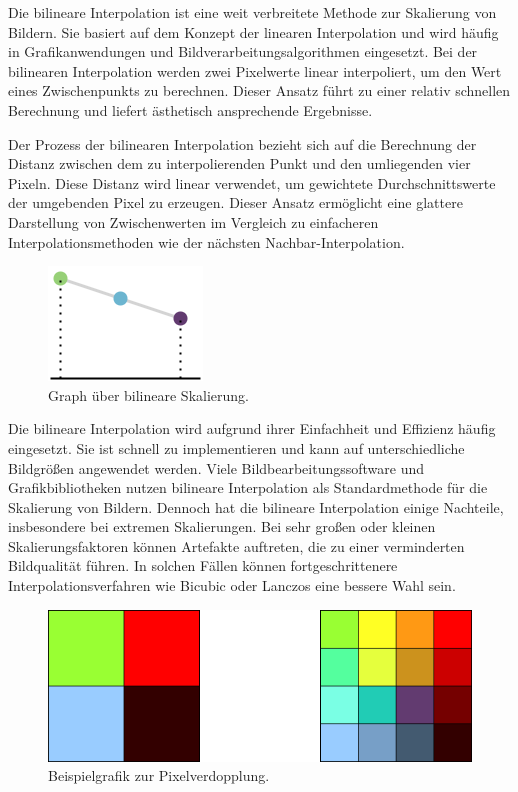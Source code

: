         Die bilineare Interpolation ist eine weit verbreitete Methode zur Skalierung von Bildern.
        Sie basiert auf dem Konzept der linearen Interpolation und wird häufig in Grafikanwendungen und Bildverarbeitungsalgorithmen eingesetzt.
        Bei der bilinearen Interpolation werden zwei Pixelwerte linear interpoliert, um den Wert eines Zwischenpunkts zu berechnen.
        Dieser Ansatz führt zu einer relativ schnellen Berechnung und liefert ästhetisch ansprechende Ergebnisse.

        Der Prozess der bilinearen Interpolation bezieht sich auf die Berechnung der Distanz zwischen dem zu interpolierenden Punkt und den umliegenden vier Pixeln.
        Diese Distanz wird linear verwendet, um gewichtete Durchschnittswerte der umgebenden Pixel zu erzeugen.
        Dieser Ansatz ermöglicht eine glattere Darstellung von Zwischenwerten im Vergleich zu einfacheren Interpolationsmethoden wie der nächsten Nachbar-Interpolation.


        \begin{figure}[h]
            \centering
            \includegraphics{img/pixel_verdopplung_graph.png}
            \caption{Graph über bilineare Skalierung.}
            \label{fig:graph_uber_bilineare_skalierung}
        \end{figure}

        Die bilineare Interpolation wird aufgrund ihrer Einfachheit und Effizienz häufig eingesetzt.
        Sie ist schnell zu implementieren und kann auf unterschiedliche Bildgrößen angewendet werden.
        Viele Bildbearbeitungssoftware und Grafikbibliotheken nutzen bilineare Interpolation als Standardmethode für die Skalierung von Bildern.
        Dennoch hat die bilineare Interpolation einige Nachteile, insbesondere bei extremen Skalierungen.
        Bei sehr großen oder kleinen Skalierungsfaktoren können Artefakte auftreten, die zu einer verminderten Bildqualität führen.
        In solchen Fällen können fortgeschrittenere Interpolationsverfahren wie Bicubic oder Lanczos eine bessere Wahl sein.


    \begin{figure}[h]
        \centering
        \includegraphics[width=\textwidth]{img/pixel_verdopplung.png}
        \caption{Beispielgrafik zur Pixelverdopplung.}
        \label{fig:beispielgrafik_zur_pixelverdopplung}
    \end{figure}
    
